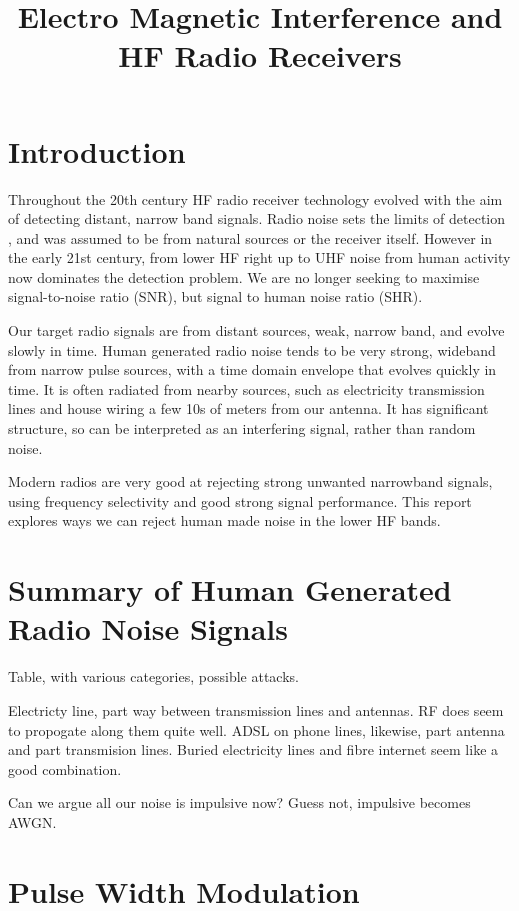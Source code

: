 \documentclass{article}
\begin{document}
\title{Electro Magnetic Interference and HF Radio Receivers}
\maketitle

\section{Introduction}
 
Throughout the 20th century HF radio receiver technology evolved with the aim of detecting distant, narrow band signals.  Radio noise sets the limits of detection \cite{itu372}, and was assumed to be from natural sources or the receiver itself. However in the early 21st century, from lower HF right up to UHF noise from human activity now dominates the detection problem.  We are no longer seeking to maximise signal-to-noise ratio (SNR), but signal to human noise ratio (SHR).

Our target radio signals are from distant sources, weak, narrow band, and evolve slowly in time. Human generated radio noise tends to be very strong, wideband from narrow pulse sources, with a time domain envelope that evolves quickly in time.  It is often radiated from nearby sources, such as electricity transmission lines and house wiring a few 10s of meters from our antenna.  It has significant structure, so can be interpreted as an interfering signal, rather than random noise.

Modern radios are very good at rejecting strong unwanted narrowband signals, using frequency selectivity and good strong signal performance.  This report explores ways we can reject human made noise in the lower HF bands.

\section{Summary of Human Generated Radio Noise Signals}

Table, with various categories, possible attacks.

Electricty line, part way between transmission lines and antennas.  RF does seem to propogate along them quite well.  ADSL on phone lines, likewise, part antenna and part transmision lines.  Buried electricity lines and fibre internet seem like a good combination.

Can we argue all our noise is impulsive now?  Guess not, impulsive becomes AWGN.

\section{Pulse Width Modulation}
\end{document}
